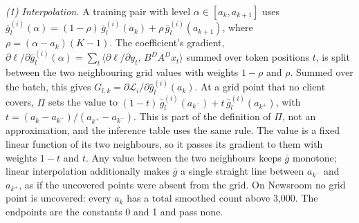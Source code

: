 \documentclass[11pt]{article}
\begin{document}
\emph{(1) Interpolation.}
A training pair with level $\alpha\in[a_k,a_{k+1}]$ uses
$\bar g^{(i)}_l(\alpha)=(1-\rho)\,\bar g^{(i)}_l(a_k)+\rho\,\bar g^{(i)}_l(a_{k+1})$, where $\rho=(\alpha-a_k)(K-1)$.
The coefficient's gradient, $\partial\ell/\partial\bar g^{(i)}_l(\alpha)=\sum_t\langle\partial\ell/\partial y_t,\,B^{D}A^{D}x_t\rangle$ summed over token positions $t$, is split between the two neighbouring grid values with weights $1-\rho$ and $\rho$.
Summed over the batch, this gives $G_{l,k}=\partial\mathcal{L}_i/\partial\bar g^{(i)}_l(a_k)$.
At a grid point that no client covers, $\Pi$ sets the value to $(1-t)\,\bar g^{(i)}_l(a_{k^-})+t\,\bar g^{(i)}_l(a_{k^+})$, with $t=(a_k-a_{k^-})/(a_{k^+}-a_{k^-})$.
This is part of the definition of $\Pi$, not an approximation, and the inference table uses the same rule.
The value is a fixed linear function of its two neighbours, so it passes its gradient to them with weights $1-t$ and $t$.
Any value between the two neighbours keeps $\bar g$ monotone; linear interpolation additionally makes $\bar g$ a single straight line between $a_{k^-}$ and $a_{k^+}$, as if the uncovered points were absent from the grid.
On Newsroom no grid point is uncovered: every $a_k$ has a total smoothed count above 3{,}000.
The endpoints are the constants 0 and 1 and pass none.
\end{document}
